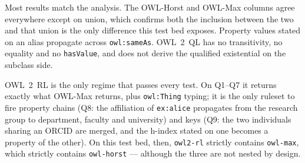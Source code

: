 \documentclass[11pt,a4paper]{article}
\begin{document}
\noindent
Most results match the analysis. The OWL-Horst and OWL-Max columns agree
everywhere except on union, which confirms both the inclusion between the two
and that union is the only difference this test bed exposes. Property values
stated on an alias propagate across \texttt{owl:sameAs}. OWL~2~QL has no
transitivity, no equality and no \texttt{hasValue}, and does not derive the
qualified existential on the subclass side.

OWL~2~RL is the only regime that passes every test. On Q1--Q7 it returns
exactly what OWL-Max returns, plus \texttt{owl:Thing} typing; it is the only
ruleset to fire property chains (Q8: the affiliation of \texttt{ex:alice}
propagates from the research group to department, faculty and university) and
keys (Q9: the two individuals sharing an ORCID are merged, and the h-index
stated on one becomes a property of the other). On this test bed, then,
\texttt{owl2-rl} strictly contains \texttt{owl-max}, which strictly contains
\texttt{owl-horst} --- although the three are not nested by design.
\end{document}
